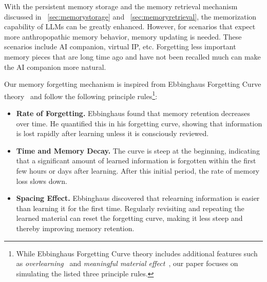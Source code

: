 With the persistent memory storage and the memory retrieval mechanism discussed in \sect~\ref{sec:memorystorage} and \sect~\ref{sec:memoryretrieval}, the memorization capability of LLMs can be greatly enhanced. However, for scenarios that expect more anthropopathic memory behavior, memory updating is needed. These scenarios include AI companion, virtual IP, etc. 
Forgetting less important memory pieces that are long time ago and have not been recalled much can make the AI companion more natural.

Our memory forgetting mechanism is inspired from Ebbinghaus Forgetting Curve theory~\cite{} and follow the following principle rules\footnote{While Ebbinghaus Forgetting Curve theory includes additional features such as \emph{overlearning}~\cite{} and \emph{meaningful material effect}~\cite{}, our paper focuses on simulating the listed three principle rules.}:
\begin{itemize}
[topsep=0pt,itemsep=0pt,partopsep=0pt,parsep=0pt,leftmargin=15pt]
\item \textbf{Rate of Forgetting.} Ebbinghaus found that memory retention decreases over time. He quantified this in his forgetting curve, showing that information is lost rapidly after learning unless it is consciously reviewed.
\item \textbf{Time and Memory Decay.} The curve is steep at the beginning, indicating that a significant amount of learned information is forgotten within the first few hours or days after learning. After this initial period, the rate of memory loss slows down.
\item \textbf{Spacing Effect.} Ebbinghaus discovered that relearning information is easier than learning it for the first time. Regularly revisiting and repeating the learned material can reset the forgetting curve, making it less steep and thereby improving memory retention.
\end{itemize}

